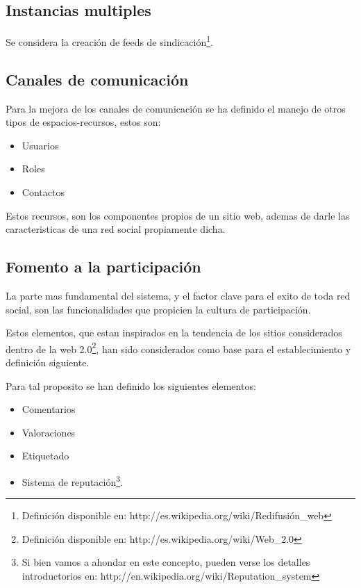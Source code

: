 \subsection{Instancias multiples}

Se considera la creación de feeds de
sindicación\footnote{Definición disponible en:
http://es.wikipedia.org/wiki/Redifusión\_web}.

\subsection{Canales de comunicación}

Para la mejora de los canales de comunicación se ha definido el manejo de otros
tipos de espacios-recursos, estos son:

\begin{itemize}
\item Usuarios
\item Roles
\item Contactos
\end{itemize}

Estos recursos, son los componentes propios de un sitio web, ademas de darle las
caracteristicas de una red social propiamente dicha.

\subsection{Fomento a la participación}

La parte mas fundamental del sistema, y el factor clave para el exito de toda
red social, son las funcionalidades que propicien la cultura de participación.

Estos elementos, que estan inspirados en la tendencia de los sitios considerados
dentro de la web 2.0\footnote{Definición disponible en:
http://es.wikipedia.org/wiki/Web\_2.0}, han sido considerados como base para el
establecimiento y definición siguiente.

Para tal proposito se han definido los siguientes elementos:

\begin{itemize}
\item Comentarios
\item Valoraciones
\item Etiquetado
\item Sistema de reputación\footnote{Si bien vamos a ahondar en este concepto,
pueden verse los detalles introductorios en:
http://en.wikipedia.org/wiki/Reputation\_system}.
\end{itemize}

